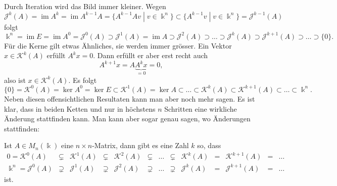 Durch Iteration wird das Bild immer kleiner.
Wegen
\[
\mathcal{J}^k (A)
=
\operatorname{im} A^k
=
\operatorname{im} A^{k-1} A
=
\{ A^{k-1} Av\;|\; v \in \Bbbk^n\}
\subset
\{ A^{k-1} v\;|\; v \in \Bbbk^n\}
=
\mathcal{J}^{k-1}(A)
\]
folgt
\begin{equation}
\Bbbk^n
=
\operatorname{im}E
=
\operatorname{im}A^0
=
\mathcal{J}^0(A)
\supset
\mathcal{J}^1(A)
=
\operatorname{im}A
\supset
\mathcal{J}^2(A)
\supset\dots\supset
\mathcal{J}^k(A)
\supset
\mathcal{J}^{k+1}(A)
\supset \dots \supset
\{0\}.
\label{buch:eigenwerte:eqn:Jkchain}
\end{equation}
Für die Kerne gilt etwas Ähnliches, sie werden immer grösser.
Ein Vektor $x\in \mathcal{K}^k(A)$ erfüllt $A^kx=0$.
Dann erfüllt er aber erst recht auch
\[
A^{k+1}x=A\underbrace{A^kx}_{\displaystyle=0}=0,
\]
also ist $x\in\mathcal{K}^k(A)$.
Es folgt
\begin{equation}
\{0\}
=
\mathcal{K}^0(A) = \ker A^0 = \ker E
\subset
\mathcal{K}^1(A) = \ker A
\subset
\dots
\subset
\mathcal{K}^k(A)
\subset
\mathcal{K}^{k+1}(A)
\subset
\dots
\subset
\Bbbk^n.
\label{buch:eigenwerte:eqn:Kkchain}
\end{equation}
Neben diesen offensichtlichen Resultaten kann man aber noch mehr
sagen.
Es ist klar, dass in beiden Ketten
\label{buch:eigenwerte:eqn:Jkchain}
und
\label{buch:eigenwerte:eqn:Kkchain}
nur in höchstens $n$ Schritten eine wirkliche Änderung stattfinden 
kann.
Man kann aber sogar genau sagen, wo Änderungen stattfinden:

\begin{satz}
\label{buch:eigenwerte:satz:ketten}
Ist $A\in M_n(\Bbbk)$ eine $n\times n$-Matrix, dann gibt es eine Zahl $k$
so, dass
\[
\begin{array}{rcccccccccccl}
0=\mathcal{K}^0(A)
&\subsetneq& \mathcal{K}^1(A) &\subsetneq& \mathcal{K}^2(A)
&\subsetneq&\dots&\subsetneq&
\mathcal{K}^k(A) &=& \mathcal{K}^{k+1}(A) &=& \dots
\\
\Bbbk^n= \mathcal{J}^0(A)
&\supsetneq& \mathcal{J}^1(A) &\supsetneq& \mathcal{J}^2(A)
&\supsetneq&\dots&\supsetneq&
\mathcal{J}^k(A) &=& \mathcal{J}^{k+1}(A) &=& \dots
\end{array}
\]
ist.
\end{satz}

